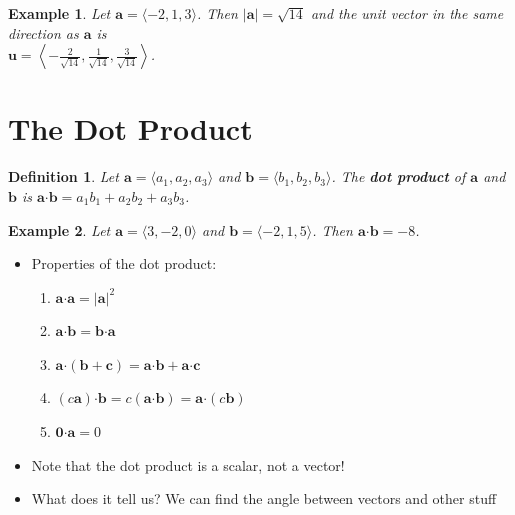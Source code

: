 \documentclass[letterpaper, 11pt, openany]{book}
\newcommand{\scdot}{\boldsymbol{\cdot}}
\theoremstyle{mytheoremstyle}
\newtheorem{definition}{Definition}[section]
\theoremstyle{myexamplestyle}
\newtheorem{example}{Example}[section]
\begin{document}
\begin{example}\label{e:vectors-unit-vector}
    Let $\mathbf{a} = \langle -2, 1, 3 \rangle$. Then $|\mathbf{a}| = \sqrt{14}$ and the unit vector in the same direction as $\displaystyle \mathbf{a}$ is \\ $\mathbf{u} = \left\langle -\frac{2}{\sqrt{14}}, \frac{1}{\sqrt{14}},  \frac{3}{\sqrt{14}}\right\rangle$. 
\end{example}

\section{The Dot Product}
\setcounter{figure}{0}

\begin{definition}\label{d:dot-product}
    Let $\mathbf{a} = \langle a_{1}, a_{2}, a_{3} \rangle$ and $\mathbf{b} = \langle b_{1}, b_{2}, b_{3} \rangle$. The \textbf{dot product} of $\mathbf{a}$ and $\mathbf{b}$ is $\mathbf{a} \scdot \mathbf{b} = a_{1}b_{1} + a_{2}b_{2} + a_{3}b_{3}$.
\end{definition}

\begin{example}\label{e:dotprod-basic}
    Let $\mathbf{a} = \langle 3, -2, 0 \rangle$ and $\mathbf{b} = \langle -2, 1, 5 \rangle$. Then $\mathbf{a} \scdot \mathbf{b} = -8$.
\end{example}

\begin{itemize}
    \item Properties of the dot product:
    \begin{enumerate}
        \item \label{p:dot-itself}$\mathbf{a} \scdot \mathbf{a} = |\mathbf{a}|^{2}$
        \item $\mathbf{a} \scdot \mathbf{b} = \mathbf{b} \scdot \mathbf{a}$
        \item $\mathbf{a} \scdot (\mathbf{b} + \mathbf{c}) = \mathbf{a} \scdot \mathbf{b} + \mathbf{a} \scdot \mathbf{c}$
        \item $(c \mathbf{a}) \scdot \mathbf{b} = c(\mathbf{a} \scdot \mathbf{b}) = \mathbf{a} \scdot (c \mathbf{b})$
        \item $\mathbf{0} \scdot \mathbf{a} = 0$
    \end{enumerate}
    \item[{\faExclamationTriangle[solid]}] Note that the dot product is a scalar, not a vector!
    \item What does it tell us? We can find the angle between vectors and other stuff
\end{itemize}
\end{document}
